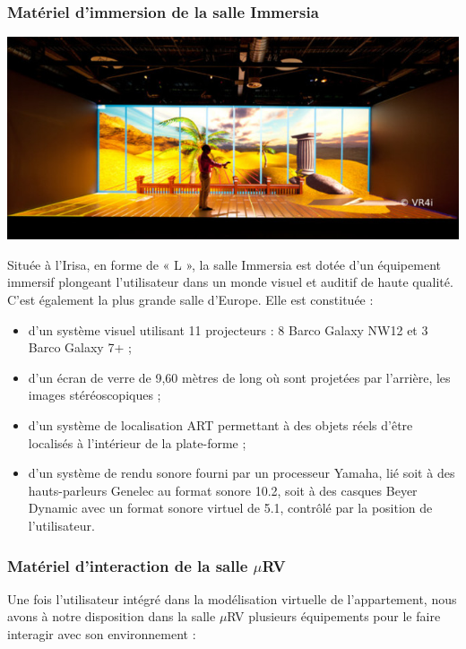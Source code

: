 \subsubsection{Matériel d'immersion de la salle Immersia}
\label{immersia}
		\noindent\begin{minipage}{0.2\textwidth}
			\includegraphics[width=\linewidth]{1-PreEtude/img/immersia}
			\end{minipage}
			\hfill
			\begin{minipage}{0.8\textwidth}
			Située à l'Irisa, en forme de « L », la salle Immersia est dotée d'un équipement immersif plongeant l'utilisateur dans un monde visuel et auditif de haute qualité. C'est également la plus grande salle d'Europe.
			Elle est constituée  :
			\begin{itemize}
				 \item d'un système visuel utilisant 11 projecteurs : 8 Barco Galaxy NW12 et 3 Barco Galaxy 7+ ;
				 \item d'un écran de verre de 9,60 mètres de long où sont projetées par l'arrière, les images stéréoscopiques ;
  				\item d'un système de localisation ART permettant à des objets réels d'être localisés à l'intérieur de la plate-forme ;
  				\item d'un système de rendu sonore fourni par un processeur Yamaha, lié soit à des hauts-parleurs Genelec au format sonore 10.2, soit à des casques Beyer Dynamic avec un format sonore virtuel de 5.1, contrôlé par la position de l'utilisateur.
			\end{itemize}
		\end{minipage}

\subsubsection{Matériel d'interaction de la salle $\mu$RV}
Une fois l'utilisateur intégré dans la modélisation virtuelle de l'appartement, nous avons à notre disposition dans la salle $\mu$RV plusieurs équipements pour le faire interagir avec son environnement :
\\

